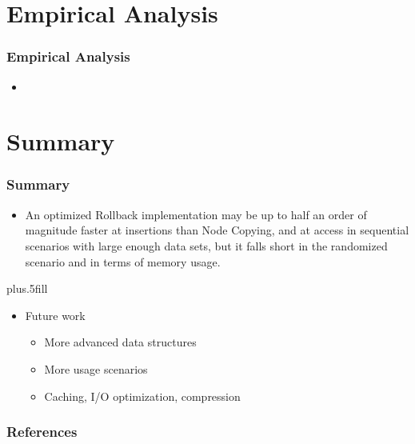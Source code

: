 \documentclass{beamer}
\begin{document}
\section{Empirical Analysis}

\begin{frame}
\frametitle{Empirical Analysis}
\begin{itemize}
  \item 
\end{itemize}
\end{frame}

\section*{Summary}

\begin{frame}
\frametitle<presentation>{Summary}

\begin{itemize}

  \item An optimized Rollback implementation may be up to half an order of
  magnitude faster at insertions than Node Copying, and at access in sequential
  scenarios with large enough data sets, but it falls short in the randomized
  scenario and in terms of memory usage.

\end{itemize}

\vskip0pt plus.5fill
\begin{itemize}
  \item Future work
  \begin{itemize}
    \item More advanced data structures
    \item More usage scenarios
    \item Caching, I/O optimization, compression
  \end{itemize}
\end{itemize}
\end{frame}

\begin{frame}
\frametitle{References}


\end{frame}
\end{document}
